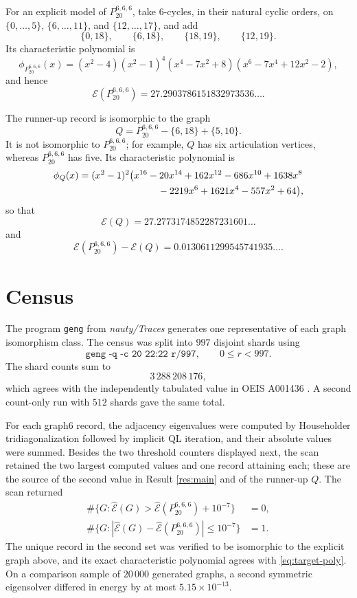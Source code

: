 \documentclass[11pt]{amsart}
\newcommand{\energy}{\mathcal E}
\newcommand{\cenergy}{\widehat{\mathcal E}}
\newcommand{\target}{P_{20}^{6,6,6}}
\begin{document}
For an explicit model of $\target$, take $6$-cycles, in their natural
cyclic orders, on $\{0,\ldots,5\}$, $\{6,\ldots,11\}$, and
$\{12,\ldots,17\}$, and add
\[
  \{0,18\},\qquad
  \{6,18\},\qquad
  \{18,19\},\qquad
  \{12,19\}.
\]
Its characteristic polynomial is
\begin{equation}\label{eq:target-poly}
  \phi_{\target}(x)
  =(x^2-4)(x^2-1)^4
   (x^4-7x^2+8)
   (x^6-7x^4+12x^2-2),
\end{equation}
and hence
\[
  \energy(\target)
  =27.2903786151832973536\ldots .
\]

The runner-up record is isomorphic to the graph
\[
  Q=\target-\{6,18\}+\{5,10\}.
\]
It is not isomorphic to $\target$; for example, $Q$ has six
articulation vertices, whereas $\target$ has five. Its characteristic
polynomial is
\begin{align}\label{eq:runner-poly}
  \phi_Q(x)
  &=(x^2-1)^2\bigl(
  x^{16}-20x^{14}+162x^{12}-686x^{10}+1638x^8 \notag\\
  &\hspace{29mm}{}-2219x^6+1621x^4-557x^2+64\bigr),
\end{align}
so that
\[
  \energy(Q)
  =27.2773174852287231601\ldots
\]
and
\[
  \energy(\target)-\energy(Q)
  =0.0130611299545741935\ldots .
\]

\section{Census}

The program \texttt{geng} from \emph{nauty/Traces} \cite{MP} generates
one representative of each graph isomorphism class. The census was
split into $997$ disjoint shards using
\[
  \texttt{geng -q -c 20 22:22 r/997},
  \qquad 0\le r<997.
\]
The shard counts sum to
\[
  3\,288\,208\,176,
\]
which agrees with the independently tabulated value in OEIS
A001436 \cite{OEIS}. A second count-only run with $512$ shards gave
the same total.

For each graph6 record, the adjacency eigenvalues were computed by
Householder tridiagonalization followed by implicit QL iteration, and
their absolute values were summed. Besides the two threshold counters
displayed next, the scan retained the two largest computed values and
one record attaining each; these are the source of the second value in
Result \ref{res:main} and of the runner-up $Q$. The scan returned
\[
\begin{aligned}
  \#\{G:\cenergy(G)>\cenergy(\target)+10^{-7}\}&=0,\\
  \#\{G:|\cenergy(G)-\cenergy(\target)|\le10^{-7}\}&=1.
\end{aligned}
\]
The unique record in the second set was verified to be isomorphic to
the explicit graph above, and its exact characteristic polynomial
agrees with \eqref{eq:target-poly}. On a comparison sample of
$20\,000$ generated graphs, a second symmetric eigensolver differed
in energy by at most $5.15\times10^{-13}$.
\end{document}
